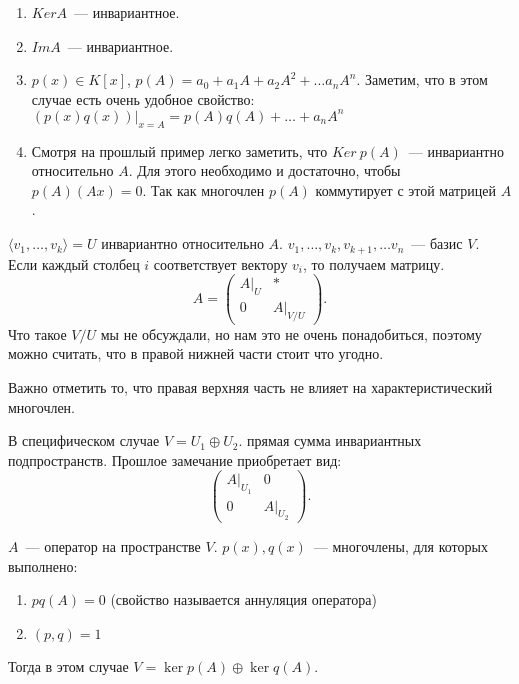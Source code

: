 \begin{examples}
    \begin{enumerate}
        \item
            $Ker A$~--- инвариантное.
        \item
             $Im A$~--- инвариантное.
         \item
             $p(x)\in K[x]$, $p(A) = a_0 + a_1 A + a_2 A^2 + \dots a_n A^n$.
             Заметим, что в этом случае есть очень удобное свойство:
             $(p(x)q(x))|_{x = A} = p(A)q(A) + \dots + a_n A^n$
         \item Смотря на прошлый пример легко заметить, что $Ker\ p(A)$~--- инвариантно относительно $A$.
             Для этого необходимо и достаточно, чтобы $p(A)(Ax) = 0$.
             Так как многочлен $p(A)$ коммутирует с этой матрицей $A$.

     \end{enumerate}
\end{examples}
\begin{remark}
    $\langle v_1,\dots, v_k\rangle = U$ инвариантно относительно $A$. $v_1,\dots, v_k, v_{k + 1},\dots v_n$~--- базис $V$.
    Если каждый столбец $i$ соответствует вектору $v_i$, то получаем матрицу.
    \[
        A = 
        \left(\begin{array}{c|c}
                A|_U & *\\
                \hline
                0 & A|_{V/U}
        \end{array}\right)
    .\] 
    Что такое $V/U$ мы не обсуждали, но нам это не очень понадобиться, поэтому можно считать, что в правой нижней части стоит что
    угодно. 
    
    Важно отметить то, что правая верхняя часть не влияет на характеристический многочлен.
\end{remark}
\begin{remark}
    В специфическом случае
    $V = U_1 \oplus U_2$. прямая сумма инвариантных подпространств. Прошлое замечание приобретает вид:
     \[
         \left(\begin{array}{c|c}
                 A|_{U_1} & 0\\
                 \hline
                 0 & A|_{U_2}
         \end{array}\right)
    .\] 
\end{remark}
\begin{theorem}
    $A$~--- оператор на пространстве $V$. $p(x), q(x)$~--- многочлены, для которых выполнено: 
     \begin{enumerate}
         \item $pq(A) = 0$ (свойство называется аннуляция оператора)
         \item $(p, q) = 1$
    \end{enumerate}
    Тогда в этом случае $V = \ker p(A) \oplus \ker q(A)$.
\end{theorem}
